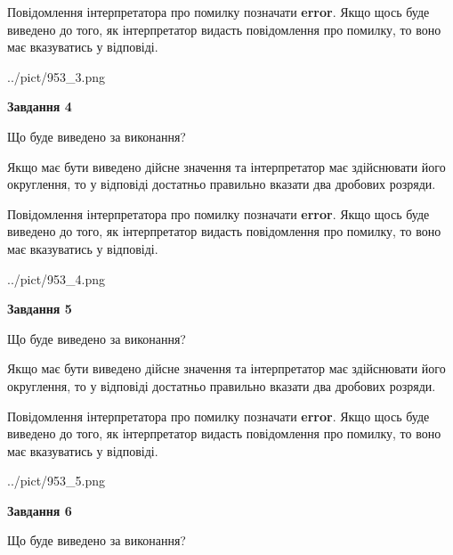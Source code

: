 \documentclass[12pt, ukrainian]{article}
\begin{document}
{\begin {Large}
Повідомлення інтерпретатора про помилку позначати \textbf{error}.
Якщо щось буде виведено до того, як інтерпретатор видасть повідомлення про помилку, 
то воно має вказуватись у відповіді. \par

\begin{center}
	{../pict/953_3.png}
\end{center}
\newpage

{\begin {center}\textbf{Завдання 4}\end {center}}\par
Що буде виведено за виконання? \par

Якщо має бути виведено дійсне значення та інтерпретатор має здійснювати його округлення, 
то у відповіді достатньо правильно вказати два дробових розряди.

Повідомлення інтерпретатора про помилку позначати \textbf{error}.
Якщо щось буде виведено до того, як інтерпретатор видасть повідомлення про помилку, 
то воно має вказуватись у відповіді. \par

\begin{center}
	{../pict/953_4.png}
\end{center}
\newpage

{\begin {center}\textbf{Завдання 5}\end {center}}\par
Що буде виведено за виконання? \par

Якщо має бути виведено дійсне значення та інтерпретатор має здійснювати його округлення, 
то у відповіді достатньо правильно вказати два дробових розряди.

Повідомлення інтерпретатора про помилку позначати \textbf{error}.
Якщо щось буде виведено до того, як інтерпретатор видасть повідомлення про помилку, 
то воно має вказуватись у відповіді. \par

\begin{center}
	{../pict/953_5.png}
\end{center}
\newpage

{\begin {center}\textbf{Завдання 6}\end {center}}\par
Що буде виведено за виконання? \par


\end{Large}}
\end{document}
